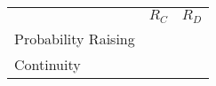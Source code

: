 \documentclass[letterpaper]{article}
\newcommand{\cmark}{\ding{51}}%
\providecommand{\cw}{\hspace{0.08in}}
\begin{document}
 
\begin{table*}
\begin{small}
\begin{tabular}{l@{\cw}c@{\cw}c}
 & $R_C$ & $R_D$\\
Probability Raising &  \cmark  &    \\  
Continuity &    \cmark  &  \\  
\end{tabular}
\end{small}
\end{table*}
\end{document}
